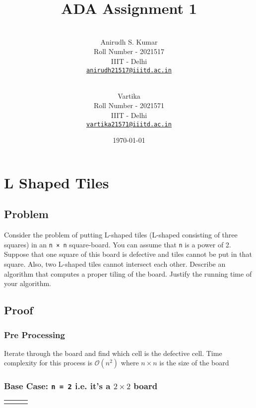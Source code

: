 \documentclass[12pt]{article}
\title{ADA Assignment 1}
\author{
    \\\vspace{0em} Anirudh S. Kumar \\\vspace{-0.5em}
    \footnotesize{Roll Number - 2021517}\\\vspace{-0.5em}
    \footnotesize{IIIT - Delhi}\\\vspace{-0.5em}
    \footnotesize{\href{mailto:anirudh21517@iiitd.ac.in}{\texttt{anirudh21517@iiitd.ac.in}}}
  \and
    \\\vspace{0em} Vartika\\\vspace{-0.5em}
    \footnotesize{Roll Number - 2021571}\\\vspace{-0.5em}
    \footnotesize{IIIT - Delhi}\\\vspace{-0.5em}
    \footnotesize{\href{mailto:vartika21571@iiitd.ac.in}{\texttt{vartika21571@iiitd.ac.in}}}
    \vspace{1em}
}
\date{\today}
\newenvironment{statement}{\color[rgb]{1.00,0.00,0.50} {}}{}
\begin{document}
\maketitle

\pagestyle{fancy}
\fancyhf{}

\section{L Shaped Tiles}
\subsection{Problem}
\begin{statement}
    Consider the problem of putting L-shaped tiles (L-shaped consisting of three squares)
    in an \texttt{n × n} square-board. You can assume that \texttt{n} is a power of 2. Suppose that one square of this
    board is defective and tiles cannot be put in that square. Also, two L-shaped tiles cannot intersect
    each other. Describe an algorithm that computes a proper tiling of the board. Justify the running
    time of your algorithm.
\end{statement}


\subsection{Proof}

\subsubsection{Pre Processing}

Iterate through the board and find which cell is the defective cell. Time complexity for this process is $\mathcal{O}(n^2)$ where $n \times n$ is the size of the board

\subsubsection{Base Case: \texttt{n = 2} i.e. it's a \texorpdfstring{$2 \times 2$}{Lg} board }

\begin{table}[ht]
    \centering
    \begin{tabular}{|M{20pt}|M{20pt}|N}
        \hline
          &                          \\[20pt]
        \hline
          &  \\[20pt]
        \hline
    \end{tabular}
\end{table}
\end{document}
